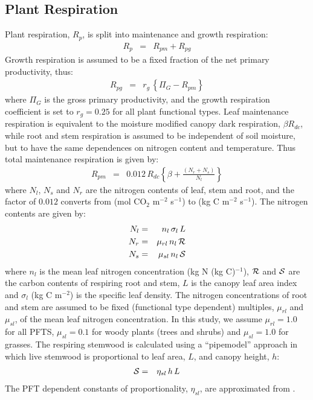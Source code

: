 \documentclass[a4paper]{article}
\begin{document}
\subsection{Plant Respiration} \label{s:photo.resp}
Plant respiration, $R_{p}$, is split into maintenance and growth
respiration:
\begin{eqnarray}
R_{p} &=& R_{pm} + R_{pg}
\end{eqnarray}
Growth respiration is assumed to be a fixed fraction of the net
primary productivity, thus:
\begin{eqnarray}
R_{pg} &=& r_{g} \, \left\{\Pi_{G} - R_{pm} \right\}
\end{eqnarray}
where $\Pi_{G}$ is the gross primary productivity, and the growth
respiration coefficient is set to $r_{g} = 0.25$ for all plant
functional types.  Leaf maintenance respiration is equivalent to the
moisture modified canopy dark respiration, $\beta R_{dc}$, while root
and stem respiration is assumed to be independent of soil moisture,
but to have the same dependences on nitrogen content and
temperature. Thus total maintenance respiration is given by:
\begin{eqnarray}
R_{pm} &=& 0.012 \, R_{dc} \left\{\beta + \frac{(N_{r}+N_{s})}{N_{l}} \right\}
\end{eqnarray}
where $N_{l}$, $N_{s}$ and $N_{r}$ are the nitrogen contents of leaf,
stem and root, and the factor of $0.012$ converts from (mol CO$_{2}$
m$^{-2}$ s$^{-1}$) to (kg C m$^{-2}$ s$^{-1}$). The nitrogen contents
are given by:
\begin{eqnarray}
N_{l} &=& n_{l} \, \sigma_{l} \, L \\
N_{r} &=& \mu_{rl} \, n_{l} \, {\cal R} \\
N_{s} &=& \mu_{sl} \, n_{l} \, {\cal S}
\end{eqnarray}
where $n_{l}$ is the mean leaf nitrogen concentration (kg N (kg
C)$^{-1}$), ${\cal R}$ and ${\cal S}$ are the carbon contents of
respiring root and stem, $L$ is the canopy leaf area index and
$\sigma_{l}$ (kg C m$^{-2}$) is the specific leaf density. The
nitrogen concentrations of root and stem are assumed to be fixed
(functional type dependent) multiples, $\mu_{rl}$ and $\mu_{sl}$, of
the mean leaf nitrogen concentration. In this study, we assume
$\mu_{rl}=1.0$ for all PFTS, $\mu_{sl}=0.1$ for woody plants (trees
and shrubs) and $\mu_{sl}=1.0$ for grasses.  The respiring stemwood is
calculated using a ``pipemodel'' approach in which live stemwood is
proportional to leaf area, $L$, and canopy height, $h$:
\begin{eqnarray}
{\cal S} &=& \eta_{sl} \, h \, L
\label{e:A34}
\end{eqnarray}
The PFT dependent constants of proportionality, $\eta_{sl}$, are
approximated from \citet{Fri93}.
\end{document}
